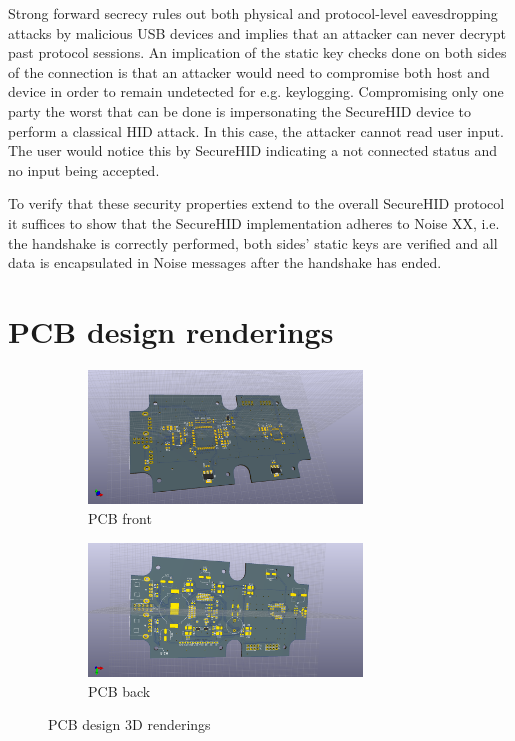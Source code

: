 \documentclass[12pt,a4paper,notitlepage]{article}
\begin{document}
Strong forward secrecy rules out both physical and protocol-level eavesdropping attacks by malicious USB devices and
implies that an attacker can never decrypt past protocol sessions. An implication of the static key checks done on both
sides of the connection is that an attacker would need to compromise both host and device in order to remain undetected
for e.g. keylogging.  Compromising only one party the worst that can be done is impersonating the SecureHID device to
perform a classical HID attack. In this case, the attacker cannot read user input.  The user would notice this by
SecureHID indicating a not connected status and no input being accepted.

To verify that these security properties extend to the overall SecureHID protocol it suffices to show that the SecureHID
implementation adheres to Noise XX, i.e. the handshake is correctly performed, both sides' static keys are verified and
all data is encapsulated in Noise messages after the handshake has ended.

\section{PCB design renderings}
\label{ch:renderings}

\begin{figure}[H]
    \centering
    \begin{subfigure}[b]{0.8\textwidth}
        \centering
        \includegraphics[width=0.8\textwidth]{pcb_front.png}
        \caption{PCB front}
    \end{subfigure} %
    \begin{subfigure}[b]{0.8\textwidth}
        \centering
        \includegraphics[width=0.8\textwidth]{pcb_back.png}
        \caption{PCB back}
    \end{subfigure}
    \caption{PCB design 3D renderings}
    \label{fig:pcb3d}
\end{figure}
\end{document}

